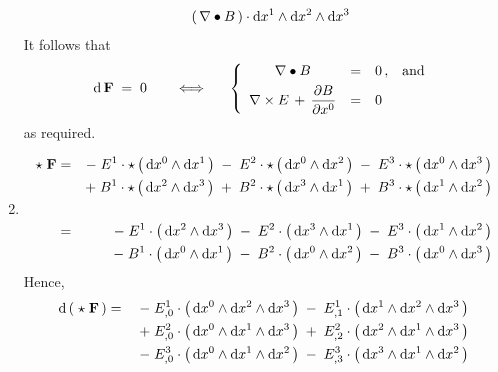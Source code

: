 \begin{enumerate}
\begin{eqnarray*}
	\\
	&&
		\left(\, \nabla \bullet B \,\right)
		\cdot \textnormal{d} x^{1} \wedge \textnormal{d} x^{2} \wedge \textnormal{d} x^{3}
	\end{eqnarray*}
	It follows that
	\begin{equation*}
		\d\,\mathbf{F} \; = \; 0
	\quad\quad
	\Longleftrightarrow
	\quad\;\;
		\left\{\begin{array}{cclc}
		\nabla \bullet B & = & 0\,, & \textnormal{and}
		\\
		\nabla \times E \,+\, \overset{{\color{white}.}}{\dfrac{\partial B}{\partial x^{0}}} & = & 0
		\end{array}\right.
	\end{equation*}
	as required.
\item
	\begin{eqnarray*}
	\star\;\mathbf{F}
	& = &
		  - \; E^{1} \cdot\star\left(\,\textnormal{d} x^{0} \wedge \textnormal{d} x^{1}\,\right)
		\; - \; E^{2} \cdot\star\left(\,\textnormal{d} x^{0} \wedge \textnormal{d} x^{2}\,\right)
		\; - \; E^{3} \cdot\star\left(\,\textnormal{d} x^{0} \wedge \textnormal{d} x^{3}\,\right)
	\\
	&&
		  +\; B^{1} \cdot\star\left(\,\textnormal{d} x^{2} \wedge \textnormal{d} x^{3}\,\right)
		\;+\; B^{2} \cdot\star\left(\,\textnormal{d} x^{3} \wedge \textnormal{d} x^{1}\,\right)
		\;+\; B^{3} \cdot\star\left(\,\textnormal{d} x^{1} \wedge \textnormal{d} x^{2}\,\right)
	\\ \\
	& = &
		   - \; E^{1} \cdot\left(\,\textnormal{d} x^{2} \wedge \textnormal{d} x^{3}\,\right)
		\; - \; E^{2} \cdot\left(\,\textnormal{d} x^{3} \wedge \textnormal{d} x^{1}\,\right)
		\; - \; E^{3} \cdot\left(\,\textnormal{d} x^{1} \wedge \textnormal{d} x^{2}\,\right)
	\\
	&&
		  -\; B^{1} \cdot\left(\,\textnormal{d} x^{0} \wedge \textnormal{d} x^{1}\,\right)
		\;-\; B^{2} \cdot\left(\,\textnormal{d} x^{0} \wedge \textnormal{d} x^{2}\,\right)
		\;-\; B^{3} \cdot\left(\,\textnormal{d} x^{0} \wedge \textnormal{d} x^{3}\,\right)
	\end{eqnarray*}
	Hence,
	\begin{eqnarray*}
	\d\left(\;\star\;\mathbf{F}\,\right)
	& = &
		\; - \; E^{1}_{,0} \cdot\left(\,\d x^ {0} \wedge \d x^{2} \wedge \d x^{3}\,\right)
		\; - \; E^{1}_{,1} \cdot\left(\,\d x^ {1} \wedge \d x^{2} \wedge \d x^{3}\,\right)
	\\
	&&
		\; + \; E^{2}_{,0} \cdot\left(\,\d x^{0} \wedge \d x^{1} \wedge \d x^{3}\,\right)
		\; + \; E^{2}_{,2} \cdot\left(\,\d x^{2} \wedge \d x^{1} \wedge \d x^{3}\,\right)
	\\
	&&
		\; - \; E^{3}_{,0} \cdot\left(\,\d x^{0} \wedge \d x^{1} \wedge \d x^{2}\,\right)
		\; - \; E^{3}_{,3} \cdot\left(\,\d x^{3} \wedge \d x^{1} \wedge \d x^{2}\,\right)
	\\

\end{eqnarray*}
\end{enumerate}
